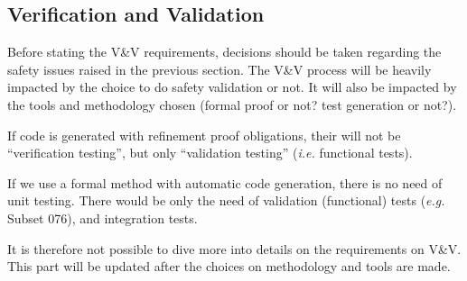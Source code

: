\documentclass{template/openetcs_article}
\begin{document}



\subsection{Verification and Validation}

\begin{issue}Before stating the V\&V requirements, decisions should be taken regarding 
the safety issues raised in the previous section. The V\&V process will be heavily impacted
by the choice to do safety validation or not. It will also be impacted by the 
tools and methodology chosen (formal proof or not? test generation or not?).

If code is generated with refinement proof obligations, 
their will not be “verification testing”, but only “validation testing” 
(\emph{i.e.} functional tests).

If we use a formal method with automatic code generation, there is no need of unit testing. 
There would be only the need of validation (functional) tests (\emph{e.g.} Subset 076), and 
integration tests.

It is therefore not possible to dive more into details on the requirements on V\&V. This part will
be updated after the choices on methodology and tools are made.
\end{issue}
\end{document}
